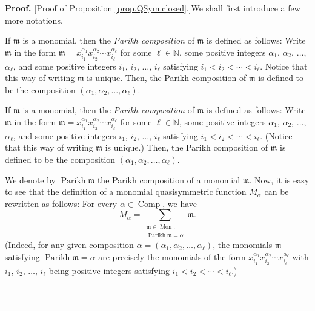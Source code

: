 \documentclass[numbers=enddot,12pt,final,onecolumn,notitlepage,abstracton]{scrartcl}%
\theoremstyle{definition}
\newenvironment{proof}[1][Proof]{\noindent\textbf{#1.} }{\ \rule{0.5em}{0.5em}}
\newenvironment{verlong}{}{}
\newenvironment{vershort}{}{}
\let\sumnonlimits\sum
\renewcommand{\sum}{\sumnonlimits\limits}
\begin{document}
\begin{proof}
[Proof of Proposition \ref{prop.QSym.closed}.]We shall first introduce a few
more notations.

\begin{vershort}
If $\mathfrak{m}$ is a monomial, then the \textit{Parikh composition} of
$\mathfrak{m}$ is defined as follows: Write $\mathfrak{m}$ in the form
$\mathfrak{m}=x_{i_{1}}^{\alpha_{1}}x_{i_{2}}^{\alpha_{2}}\cdots x_{i_{\ell}%
}^{\alpha_{\ell}}$ for some $\ell\in\mathbb{N}$, some positive integers
$\alpha_{1}$, $\alpha_{2}$, $\ldots$, $\alpha_{\ell}$, and some positive
integers $i_{1}$, $i_{2}$, $\ldots$, $i_{\ell}$ satisfying $i_{1}<i_{2}%
<\cdots<i_{\ell}$. Notice that this way of writing $\mathfrak{m}$ is unique.
Then, the Parikh composition of $\mathfrak{m}$ is defined to be the
composition $\left(  \alpha_{1},\alpha_{2},\ldots,\alpha_{\ell}\right)  $.
\end{vershort}

\begin{verlong}
If $\mathfrak{m}$ is a monomial, then the \textit{Parikh composition} of
$\mathfrak{m}$ is defined as follows: Write $\mathfrak{m}$ in the form
$\mathfrak{m}=x_{i_{1}}^{\alpha_{1}}x_{i_{2}}^{\alpha_{2}}\cdots x_{i_{\ell}%
}^{\alpha_{\ell}}$ for some $\ell\in\mathbb{N}$, some positive integers
$\alpha_{1}$, $\alpha_{2}$, $\ldots$, $\alpha_{\ell}$, and some positive
integers $i_{1}$, $i_{2}$, $\ldots$, $i_{\ell}$ satisfying $i_{1}<i_{2}%
<\cdots<i_{\ell}$. (Notice that this way of writing $\mathfrak{m}$ is unique.)
Then, the Parikh composition of $\mathfrak{m}$ is defined to be the
composition $\left(  \alpha_{1},\alpha_{2},\ldots,\alpha_{\ell}\right)  $.
\end{verlong}

We denote by $\operatorname*{Parikh}\mathfrak{m}$ the Parikh composition of a
monomial $\mathfrak{m}$. Now, it is easy to see that the definition of a
monomial quasisymmetric function $M_{\alpha}$ can be rewritten as follows: For
every $\alpha\in\operatorname*{Comp}$, we have%
\begin{equation}
M_{\alpha}=\sum_{\substack{\mathfrak{m}\in\operatorname*{Mon}%
;\\\operatorname*{Parikh}\mathfrak{m}=\alpha}}\mathfrak{m}.
\label{pf.prop.QSym.closed.Malpha-via-Parikh}%
\end{equation}
(Indeed, for any given composition $\alpha=\left(  \alpha_{1},\alpha
_{2},\ldots,\alpha_{\ell}\right)  $, the monomials $\mathfrak{m}$ satisfying
$\operatorname*{Parikh}\mathfrak{m}=\alpha$ are precisely the monomials of the
form $x_{i_{1}}^{\alpha_{1}}x_{i_{2}}^{\alpha_{2}}\cdots x_{i_{\ell}}%
^{\alpha_{\ell}}$ with $i_{1}$, $i_{2}$, $\ldots$, $i_{\ell}$ being positive
integers satisfying $i_{1}<i_{2}<\cdots<i_{\ell}$.)


\end{proof}
\end{document}
